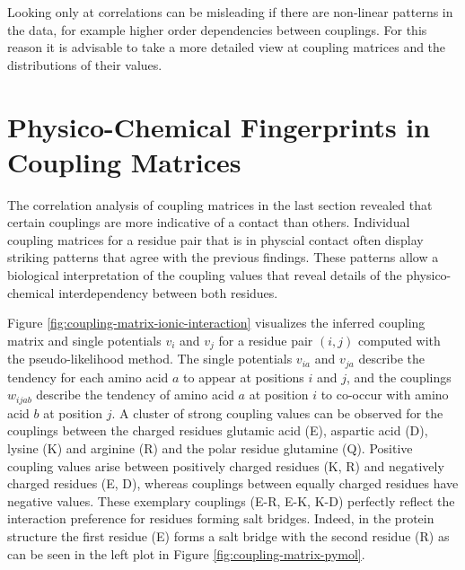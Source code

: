 \documentclass[11pt,a4paper,twoside]{book}
\newcommand{\vi}{v_{i}}
\newcommand{\vj}{v_{j}}
\newcommand{\via}{v_{ia}}
\newcommand{\vja}{v_{ja}}
\newcommand{\wijab}{w_{ijab}}
\theoremstyle{definition}
\theoremstyle{definition}
\theoremstyle{remark}
\begin{document}
Looking only at correlations can be misleading if there are non-linear
patterns in the data, for example higher order dependencies between
couplings. For this reason it is advisable to take a more detailed view
at coupling matrices and the distributions of their values.

\section{Physico-Chemical Fingerprints in Coupling
Matrices}\label{physico-chemical-fingerprints-in-coupling-matrices}

The correlation analysis of coupling matrices in the last section
revealed that certain couplings are more indicative of a contact than
others. Individual coupling matrices for a residue pair that is in
physcial contact often display striking patterns that agree with the
previous findings. These patterns allow a biological interpretation of
the coupling values that reveal details of the physico-chemical
interdependency between both residues.

Figure \ref{fig:coupling-matrix-ionic-interaction} visualizes the
inferred coupling matrix and single potentials \(\vi\) and \(\vj\) for a
residue pair \((i,j)\) computed with the pseudo-likelihood method. The
single potentials \(\via\) and \(\vja\) describe the tendency for each
amino acid \(a\) to appear at positions \(i\) and \(j\), and the
couplings \(\wijab\) describe the tendency of amino acid \(a\) at
position \(i\) to co-occur with amino acid \(b\) at position \(j\). A
cluster of strong coupling values can be observed for the couplings
between the charged residues glutamic acid (E), aspartic acid (D),
lysine (K) and arginine (R) and the polar residue glutamine (Q).
Positive coupling values arise between positively charged residues (K,
R) and negatively charged residues (E, D), whereas couplings between
equally charged residues have negative values. These exemplary couplings
(E-R, E-K, K-D) perfectly reflect the interaction preference for
residues forming salt bridges. Indeed, in the protein structure the
first residue (E) forms a salt bridge with the second residue (R) as can
be seen in the left plot in Figure \ref{fig:coupling-matrix-pymol}.
\end{document}
